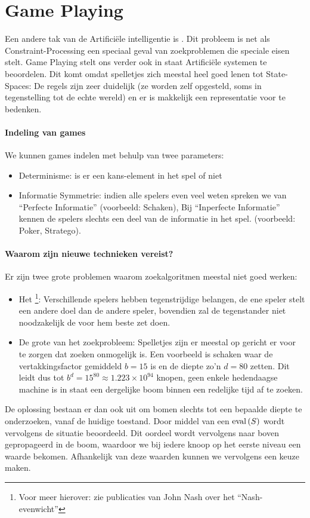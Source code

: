 \section{Game Playing}
\label{s:gamePlaying}
Een andere tak van de Artificiële intelligentie is . Dit probleem is net als Constraint-Processing een speciaal geval van zoekproblemen die speciale eisen stelt. Game Playing stelt ons verder ook in staat Artificiële systemen te beoordelen. Dit komt omdat spelletjes zich meestal heel goed lenen tot State-Spaces: De regels zijn zeer duidelijk (ze worden zelf opgesteld, soms in tegenstelling tot de echte wereld) en er is makkelijk een representatie voor te bedenken.
\paragraph{Indeling van games}
We kunnen games indelen met behulp van twee parameters:
\begin{itemize}
 \item Determinisme: is er een kans-element in het spel of niet
 \item Informatie Symmetrie: indien alle spelers even veel weten spreken we van ``Perfecte Informatie'' (voorbeeld: Schaken), Bij ``Inperfecte Informatie'' kennen de spelers slechts een deel van de informatie in het spel. (voorbeeld: Poker, Stratego).
\end{itemize}
\paragraph{Waarom zijn nieuwe technieken vereist?}
Er zijn twee grote problemen waarom zoekalgoritmen meestal niet goed werken:
\begin{itemize}
 \item Het \footnote{Voor meer hierover: zie publicaties van John Nash over het ``Nash-evenwicht''}: Verschillende spelers hebben tegenstrijdige belangen, de ene speler stelt een andere doel dan de andere speler, bovendien zal de tegenstander niet noodzakelijk de voor hem beste zet doen.
 \item De grote van het zoekprobleem: Spelletjes zijn er meestal op gericht er voor te zorgen dat zoeken onmogelijk is. Een voorbeeld is schaken waar de vertakkingsfactor gemiddeld $b=15$ is en de diepte zo'n $d=80$ zetten. Dit leidt dus tot $b^d=15^{80}\approx1.223\times10^{94}$ knopen, geen enkele hedendaagse machine is in staat een dergelijke boom binnen een redelijke tijd af te zoeken.
\end{itemize}
De oplossing bestaan er dan ook uit om bomen slechts tot een bepaalde diepte te onderzoeken, vanaf de huidige toestand. Door middel van een  $\mbox{eval}\left( S \right)$ wordt vervolgens de situatie beoordeeld. Dit oordeel wordt vervolgens naar boven gepropageerd in de boom, waardoor we bij iedere knoop op het eerste niveau een waarde bekomen. Afhankelijk van deze waarden kunnen we vervolgens een keuze maken.
